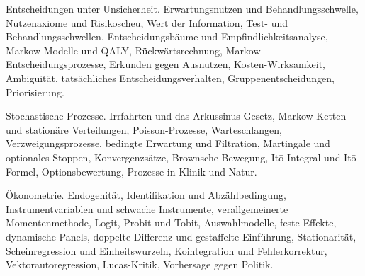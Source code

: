 \begin{merksatz}
Entscheidungen unter Unsicherheit. Erwartungsnutzen und Behandlungsschwelle, Nutzenaxiome und Risikoscheu, Wert der Information, Test- und Behandlungsschwellen, Entscheidungsbäume und Empfindlichkeitsanalyse, Markow-Modelle und QALY, Rückwärtsrechnung, Markow-Entscheidungsprozesse, Erkunden gegen Ausnutzen, Kosten-Wirksamkeit, Ambiguität, tatsächliches Entscheidungsverhalten, Gruppenentscheidungen, Priorisierung.

\end{merksatz}

\begin{merksatz}
Stochastische Prozesse. Irrfahrten und das Arkussinus-Gesetz, Markow-Ketten und stationäre Verteilungen, Poisson-Prozesse, Warteschlangen, Verzweigungsprozesse, bedingte Erwartung und Filtration, Martingale und optionales Stoppen, Konvergenzsätze, Brownsche Bewegung, Itō-Integral und Itō-Formel, Optionsbewertung, Prozesse in Klinik und Natur.

\end{merksatz}

\begin{merksatz}
Ökonometrie. Endogenität, Identifikation und Abzählbedingung, Instrumentvariablen und schwache Instrumente, verallgemeinerte Momentenmethode, Logit, Probit und Tobit, Auswahlmodelle, feste Effekte, dynamische Panels, doppelte Differenz und gestaffelte Einführung, Stationarität, Scheinregression und Einheitswurzeln, Kointegration und Fehlerkorrektur, Vektorautoregression, Lucas-Kritik, Vorhersage gegen Politik.

\end{merksatz}

